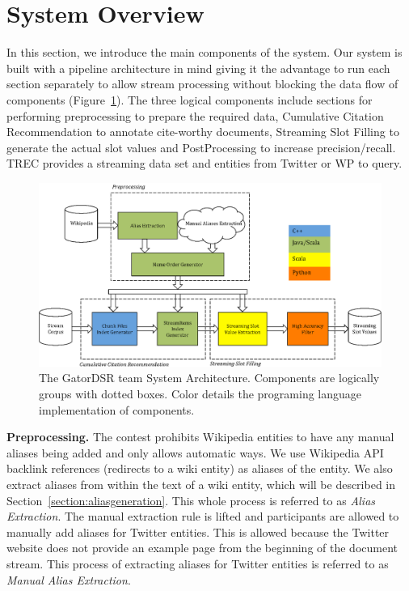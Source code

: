 
\section{System Overview}

In this section, we introduce the main components of the system. Our system is 
built with a pipeline architecture in mind giving it the advantage to run 
each section separately to allow stream processing without blocking the data flow of components 
(Figure~\ref{fig:system}).
The three logical components include sections for performing preprocessing to prepare the required data, 
Cumulative Citation Recommendation to annotate cite-worthy documents, Streaming 
Slot Filling to generate the actual slot values and PostProcessing to 
increase precision/recall. 
TREC provides a streaming data set and  entities from Twitter or WP to query.


\begin{figure}
  \centering
  \includegraphics[width=6in]{./images/sdl-eps-converted-to.pdf}
  \vspace*{-.1in} 
  \caption{The GatorDSR team System Architecture.
  Components are logically groups with dotted boxes.
  Color details the programing language implementation of components.}
  \label{fig:system}
  \vspace*{-.2in}
\end{figure}



\textbf{Preprocessing.}
\label{sec:preproc}
The contest prohibits Wikipedia entities to have any manual aliases being added and only
allows automatic ways. We use Wikipedia API backlink references
(redirects to a wiki entity) as aliases of the entity. We also extract 
aliases from within the text of a wiki entity, which will be described in
Section~\ref{section:aliasgeneration}. This whole process is referred to as
\textit{Alias Extraction}. 
The manual extraction rule is lifted and participants are allowed to manually add aliases for Twitter entities.
This is allowed because the Twitter website does not provide an example page from the beginning of the document stream.
This process of extracting
aliases for Twitter entities is referred to as \textit{Manual Alias Extraction}.

